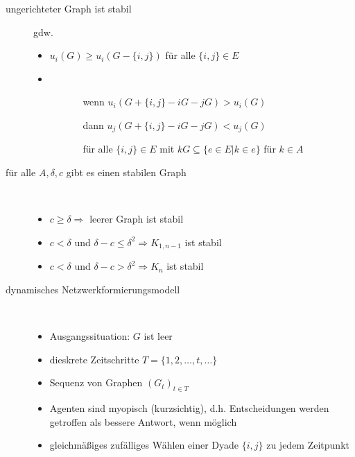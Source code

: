 	\begin{description}
		\item[ungerichteter Graph ist stabil] gdw.
			\begin{itemize}
				\item $u_i(G)\geq u_i(G-\{i,j\})$ für alle $\{i,j\}\in E$
				\item \ \vspace*{-1.25\baselineskip}
					\begin{itemize}
						\item[] \begin{itemize}
							\item[wenn] $u_i(G+\{i,j\}-iG-jG)>u_i(G)$
							\item[dann] $u_j(G+\{i,j\}-iG-jG)<u_j(G)$
							\item[] für alle $\{i,j\}\in E$ mit $kG\subseteq\{e\in E|k\in e\}$ für $k\in A$
						\end{itemize}
					\end{itemize}
			\end{itemize}
		\item[für alle $A,\delta,c$ gibt es einen stabilen Graph]\ \\\vspace*{-\baselineskip}
			\begin{itemize}
				\item $c\geq \delta\Rightarrow$ leerer Graph ist stabil
				\item $c<\delta$ und $\delta-c\leq \delta^2\Rightarrow K_{1,n-1}$ ist stabil
				\item $c<\delta$ und $\delta-c>\delta^2\Rightarrow K_n$ ist stabil
			\end{itemize}
		\item[dynamisches Netzwerkformierungsmodell]\ \\\vspace*{-\baselineskip}
			\begin{itemize}
				\item Ausgangssituation: $G$ ist leer
				\item dieskrete Zeitschritte $T=\{1,2,\dots,t,\dots\}$
				\item Sequenz von Graphen $(G_t)_{t\in T}$
				\item Agenten sind myopisch (kurzsichtig), d.h. Entscheidungen werden getroffen als bessere Antwort, wenn möglich
				\item gleichmäßiges zufälliges  Wählen einer Dyade $\{i,j\}$  zu jedem Zeitpunkt
					\begin{itemize}

\end{itemize}
\end{itemize}
\end{description}

